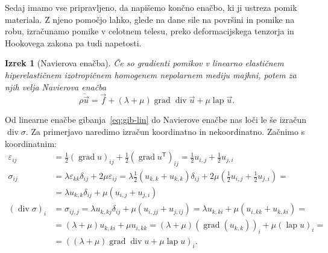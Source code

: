 \documentclass[a4paper,twoside]{article}
\theoremstyle{definition} %
\theoremstyle{plain} %
\newtheorem{izrek}[definicija]{Izrek}
\numberwithin{equation}{section}
\newcommand{\T}{\mathsf{T}}
\newcommand{\lap}{\operatorname{lap}}
\renewcommand{\div}{\operatorname{div}}
\newcommand{\grad}{\operatorname{grad}}
\newcommand{\eps}{\varepsilon}
\newcommand{\vu}{\vec{u}}
\newcommand{\vf}{\vec{f}}
\newcommand{\ts}{\sigma}
\begin{document}
Sedaj imamo vse pripravljeno, da napišemo končno enačbo, ki ji ustreza pomik
materiala. Z njeno pomočjo lahko, glede na dane sile na površini in pomike na
robu, izračunamo pomike v celotnem telesu, preko deformacijskega tenzorja in
Hookovega zakona pa tudi napetosti.
\begin{izrek}[Navierova enačba]
  Če so gradienti pomikov v linearno elastičnem hiperelastičnem
  izotropičnem homogenem nepolarnem mediju majhni, potem za njih velja
  \emph{Navierova enačba}
  \begin{equation}
    \rho \ddot{\vu} = \vf + (\lambda + \mu)\grad\div \vu + \mu \lap \vu.
    \label{eq:navier}
  \end{equation}
\end{izrek}
\proof
Od linearne enačbe gibanja~\eqref{eq:gib-lin} do Navierove enačbe nas loči le še
izračun $\div \sigma$. Za primerjavo naredimo izračun koordinatno in
nekoordinatno. Začnimo s koordinatnim:
\begin{align*}
  \eps_{ij} &= \frac12 (\grad u)_{ij} + \frac12 (\grad u^\T)_{ij} =
  \frac12 u_{i,j} + \frac12 u_{j,i} \\
  \ts_{ij} &= \lambda \eps_{kk} \delta_{ij} + 2 \mu \eps_{ij} =
  \lambda \frac{1}{2} (u_{k,k} + u_{k,k}) \delta_{ij} + 2 \mu( \frac12 u_{i,j} +
  \frac12 u_{j,i}) =  \\ &= \lambda u_{k, k}\delta_{ij} + \mu (u_{i,j} +u_{j,i})
  \\
  (\div \ts)_i &= \sigma_{ij,j} = \lambda u_{k, kj}\delta_{ij} + \mu (u_{i,jj}
+u_{j,ij}) = \lambda u_{k,ki} + \mu (u_{i,kk} + u_{k,ki}) = \\
&= (\lambda + \mu)u_{k,ki} + \mu u_{i,kk} = (\lambda+\mu)(\grad(u_{k,k}))_i +
\mu (\lap u)_i = \\ &=
((\lambda + \mu)\grad\div u + \mu \lap u)_i.
\end{align*}
\end{document}

